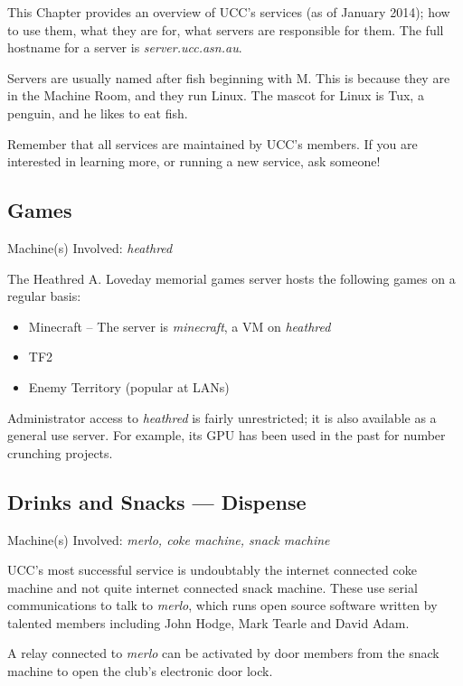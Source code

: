 
\newcommand{\server}[1]{\emph{#1}}

\begin{mdframed}
This Chapter provides an overview of UCC's services (as of January 2014); how to use them, what they are for, what servers are responsible for them. The full hostname for a server is \server{server.ucc.asn.au}.

 Servers are usually named after fish beginning with M. This is because they are in the Machine Room, and they run Linux. The mascot for Linux is Tux, a penguin, and he likes to eat fish.


Remember that all services are maintained by UCC's members. If you are interested in learning more, or running a new service, ask someone!


\end{mdframed}

\newenvironment{uccservice}[2]
{
	\begin{mdframed}
	\section{#1}
	\begin{mdframed}
		Machine(s) Involved: \server{#2}
	\end{mdframed}

	
}{\end{mdframed}}

\begin{uccservice}{Games}{heathred}

The Heathred A. Loveday memorial games server hosts the following games on a regular basis:
\begin{itemize}
	\item Minecraft -- The server is \server{minecraft}, a VM on \server{heathred}
	\item TF2
	\item Enemy Territory (popular at LANs)
\end{itemize}


Administrator access to \server{heathred} is fairly unrestricted; it is also available as a general use server. For example, its GPU has been used in the past for number crunching projects.

\end{uccservice}

\pagebreak

\begin{uccservice}{Drinks and Snacks --- Dispense}{merlo, coke machine, snack machine}

UCC's most successful service is undoubtably the internet connected coke machine and not quite internet connected snack machine. These use serial communications to talk to \server{merlo}, which runs open source software written by talented members including John Hodge, Mark Tearle and David Adam. 

A relay connected to \server{merlo} can be activated by door members from the snack machine to open the club's electronic door lock.

\end{uccservice}



